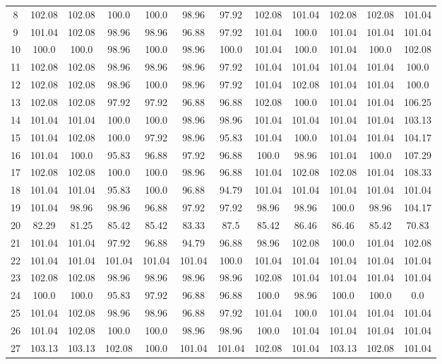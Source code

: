 \begin{table}[H]
\begin{tabular}{|c|c|c|c|c|c|c|c|c|c|c|c|}
8 & 102.08 & 102.08 & 100.0 & 100.0 & 98.96 & 97.92 & 102.08 & 101.04 & 102.08 & 102.08 & 101.04\\
9 & 101.04 & 102.08 & 98.96 & 98.96 & 96.88 & 97.92 & 101.04 & 100.0 & 101.04 & 101.04 & 101.04\\
10 & 100.0 & 100.0 & 98.96 & 100.0 & 98.96 & 100.0 & 101.04 & 100.0 & 101.04 & 100.0 & 102.08\\
11 & 102.08 & 102.08 & 98.96 & 98.96 & 98.96 & 97.92 & 101.04 & 101.04 & 101.04 & 101.04 & 100.0\\
12 & 102.08 & 102.08 & 98.96 & 100.0 & 98.96 & 97.92 & 101.04 & 102.08 & 101.04 & 101.04 & 100.0\\
13 & 102.08 & 102.08 & 97.92 & 97.92 & 96.88 & 96.88 & 102.08 & 100.0 & 101.04 & 101.04 & 106.25\\
14 & 101.04 & 101.04 & 100.0 & 100.0 & 98.96 & 98.96 & 101.04 & 101.04 & 101.04 & 101.04 & 103.13\\
15 & 101.04 & 102.08 & 100.0 & 97.92 & 98.96 & 95.83 & 101.04 & 100.0 & 101.04 & 101.04 & 104.17\\
16 & 101.04 & 100.0 & 95.83 & 96.88 & 97.92 & 96.88 & 100.0 & 98.96 & 101.04 & 100.0 & 107.29\\
17 & 102.08 & 102.08 & 100.0 & 100.0 & 98.96 & 96.88 & 101.04 & 102.08 & 102.08 & 101.04 & 108.33\\
18 & 101.04 & 101.04 & 95.83 & 100.0 & 96.88 & 94.79 & 101.04 & 101.04 & 101.04 & 101.04 & 101.04\\
19 & 101.04 & 98.96 & 98.96 & 96.88 & 97.92 & 97.92 & 98.96 & 98.96 & 100.0 & 98.96 & 104.17\\
20 & 82.29 & 81.25 & 85.42 & 85.42 & 83.33 & 87.5 & 85.42 & 86.46 & 86.46 & 85.42 & 70.83\\
21 & 101.04 & 101.04 & 97.92 & 96.88 & 94.79 & 96.88 & 98.96 & 102.08 & 100.0 & 101.04 & 102.08\\
22 & 101.04 & 101.04 & 101.04 & 101.04 & 101.04 & 100.0 & 101.04 & 101.04 & 101.04 & 101.04 & 101.04\\
23 & 102.08 & 102.08 & 98.96 & 98.96 & 98.96 & 98.96 & 102.08 & 101.04 & 101.04 & 101.04 & 101.04\\
24 & 100.0 & 100.0 & 95.83 & 97.92 & 96.88 & 96.88 & 100.0 & 98.96 & 100.0 & 100.0 & 0.0\\
25 & 101.04 & 102.08 & 98.96 & 98.96 & 96.88 & 97.92 & 101.04 & 100.0 & 101.04 & 101.04 & 101.04\\
26 & 101.04 & 102.08 & 100.0 & 100.0 & 98.96 & 98.96 & 100.0 & 101.04 & 101.04 & 101.04 & 101.04\\
27 & 103.13 & 103.13 & 102.08 & 100.0 & 101.04 & 101.04 & 102.08 & 101.04 & 103.13 & 102.08 & 101.04\\
\hline\hline
  \end{tabular}
  \label{tab:oarlimits3}
\end{table}

